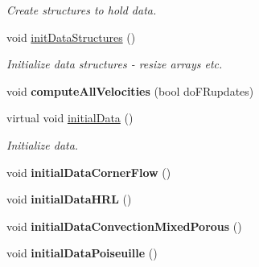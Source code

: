 \begin{DoxyCompactItemize}
\begin{DoxyCompactList}\small\item\em Create structures to hold data. \end{DoxyCompactList}\item 
\hypertarget{class_a_m_r_level_mushy_layer_ac0291e7b321a6f26a057dfd2d6fb9466}{void \hyperlink{class_a_m_r_level_mushy_layer_ac0291e7b321a6f26a057dfd2d6fb9466}{init\-Data\-Structures} ()}\label{class_a_m_r_level_mushy_layer_ac0291e7b321a6f26a057dfd2d6fb9466}

\begin{DoxyCompactList}\small\item\em Initialize data structures -\/ resize arrays etc. \end{DoxyCompactList}\item 
\hypertarget{class_a_m_r_level_mushy_layer_a8dcd4deaca137c36c34b377c1f27d8af}{void {\bfseries compute\-All\-Velocities} (bool do\-F\-Rupdates)}\label{class_a_m_r_level_mushy_layer_a8dcd4deaca137c36c34b377c1f27d8af}

\item 
\hypertarget{class_a_m_r_level_mushy_layer_adae77fea47630fd1e3c2dea1c59e4c3a}{virtual void \hyperlink{class_a_m_r_level_mushy_layer_adae77fea47630fd1e3c2dea1c59e4c3a}{initial\-Data} ()}\label{class_a_m_r_level_mushy_layer_adae77fea47630fd1e3c2dea1c59e4c3a}

\begin{DoxyCompactList}\small\item\em Initialize data. \end{DoxyCompactList}\item 
\hypertarget{class_a_m_r_level_mushy_layer_ae1b467d34bd12136bab9f15b2186fd56}{void {\bfseries initial\-Data\-Corner\-Flow} ()}\label{class_a_m_r_level_mushy_layer_ae1b467d34bd12136bab9f15b2186fd56}

\item 
\hypertarget{class_a_m_r_level_mushy_layer_a3018e7aa05879f67daa66025f1a5dc02}{void {\bfseries initial\-Data\-H\-R\-L} ()}\label{class_a_m_r_level_mushy_layer_a3018e7aa05879f67daa66025f1a5dc02}

\item 
\hypertarget{class_a_m_r_level_mushy_layer_a3b71c86932fba19e9ff28e40503bc299}{void {\bfseries initial\-Data\-Convection\-Mixed\-Porous} ()}\label{class_a_m_r_level_mushy_layer_a3b71c86932fba19e9ff28e40503bc299}

\item 
\hypertarget{class_a_m_r_level_mushy_layer_a19fb2e0f21a8e3f92e6a6f4622dd9654}{void {\bfseries initial\-Data\-Poiseuille} ()}\label{class_a_m_r_level_mushy_layer_a19fb2e0f21a8e3f92e6a6f4622dd9654}


\end{DoxyCompactItemize}
